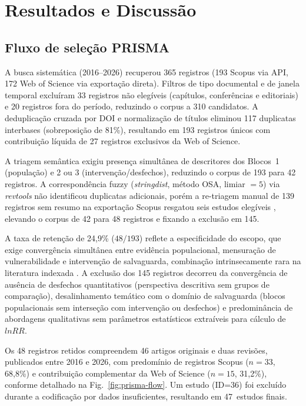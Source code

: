 \documentclass[12pt,a4paper]{article}
\begin{document}
\section{Resultados e Discussão}
\label{sec:results}

\subsection{Fluxo de seleção PRISMA}
\label{sec:prisma-flow}

A busca sistemática (2016--2026) recuperou 365 registros (193 Scopus via API, 172 Web of Science via exportação direta). Filtros de tipo documental e de janela temporal excluíram 33 registros não elegíveis (capítulos, conferências e editoriais) e 20 registros fora do período, reduzindo o corpus a 310 candidatos. A deduplicação cruzada por DOI e normalização de títulos eliminou 117 duplicatas interbases (sobreposição de 81\%), resultando em 193 registros únicos com contribuição líquida de 27 registros exclusivos da Web of Science.

A triagem semântica exigiu presença simultânea de descritores dos Blocos~1 (população) e 2 ou 3 (intervenção/desfechos), reduzindo o corpus de 193 para 42 registros. A correspondência fuzzy (\textit{stringdist}, método OSA, limiar $= 5$) via \textit{revtools} \citep{Westgate2019} não identificou duplicatas adicionais, porém a re-triagem manual de 139 registros sem resumo na exportação Scopus resgatou seis estudos elegíveis \citep{Aswani2020,Bussmann2018,Ghanimi2022,Malapane2024,RodriguezCruz2022,Rodriguez2018}, elevando o corpus de 42 para 48 registros e fixando a exclusão em 145.

A taxa de retenção de 24,9\% ($48/193$) reflete a especificidade do escopo, que exige convergência simultânea entre evidência populacional, mensuração de vulnerabilidade e intervenção de salvaguarda, combinação intrinsecamente rara na literatura indexada \citep{Agrawal2002,GomezBaggethun2013}. A exclusão dos 145 registros decorreu da convergência de ausência de desfechos quantitativos (perspectiva descritiva sem grupos de comparação), desalinhamento temático com o domínio de salvaguarda (blocos populacionais sem interseção com intervenção ou desfechos) e predominância de abordagens qualitativas sem parâmetros estatísticos extraíveis para cálculo de $lnRR$.

Os 48 registros retidos compreendem 46 artigos originais e duas revisões, publicados entre 2016 e 2026, com predomínio de registros Scopus ($n = 33$, 68,8\%) e contribuição complementar da Web of Science ($n = 15$, 31,2\%), conforme detalhado na Fig.~\ref{fig:prisma-flow}. Um estudo (ID=36) foi excluído durante a codificação por dados insuficientes, resultando em 47~estudos finais.
\end{document}

